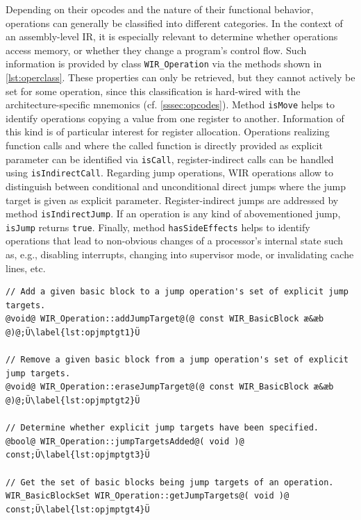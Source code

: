 Depending on their opcodes and the nature of their functional behavior, operations can generally be classified into different categories.
In the context of an assembly-level \gls{IR}, it is especially relevant to determine whether operations access memory, or whether they change a program's control flow.
Such information is provided by class \texttt{WIR\_Operation} via the methods shown in \cref{lst:operclass}.
These properties can only be retrieved, but they cannot actively be set for some operation, since this classification is hard-wired with the architecture-specific mnemonics (cf. \cref{sssec:opcodes}).
Method \texttt{isMove} helps to identify operations copying a value from one register to another.
Information of this kind is of particular interest for register allocation.
Operations realizing function calls and where the called function is directly provided as explicit parameter can be identified via \texttt{isCall}, register-indirect calls can be handled using \texttt{isIndirectCall}.
Regarding jump operations, \gls{WIR} operations allow to distinguish between conditional and unconditional direct jumps where the jump target is given as explicit parameter.
Register-indirect jumps are addressed by method \texttt{isIndirectJump}.
If an operation is any kind of abovementioned jump, \texttt{isJump} returns \texttt{true}.
Finally, method \texttt{hasSideEffects} helps to identify operations that lead to non-obvious changes of a processor's internal state such as, e.g., disabling interrupts, changing into supervisor mode, or invalidating cache lines, etc.

\begin{lstlisting}[style=code,float=t,caption={Jump Target Handling of Class \texttt{WIR\_Operation}},label=lst:opjmptgt]
// Add a given basic block to a jump operation's set of explicit jump targets.
@void@ WIR_Operation::addJumpTarget@(@ const WIR_BasicBlock æ&æb @)@;Ü\label{lst:opjmptgt1}Ü

// Remove a given basic block from a jump operation's set of explicit jump targets.
@void@ WIR_Operation::eraseJumpTarget@(@ const WIR_BasicBlock æ&æb @)@;Ü\label{lst:opjmptgt2}Ü

// Determine whether explicit jump targets have been specified.
@bool@ WIR_Operation::jumpTargetsAdded@( void )@ const;Ü\label{lst:opjmptgt3}Ü

// Get the set of basic blocks being jump targets of an operation.
WIR_BasicBlockSet WIR_Operation::getJumpTargets@( void )@ const;Ü\label{lst:opjmptgt4}Ü
\end{lstlisting}

